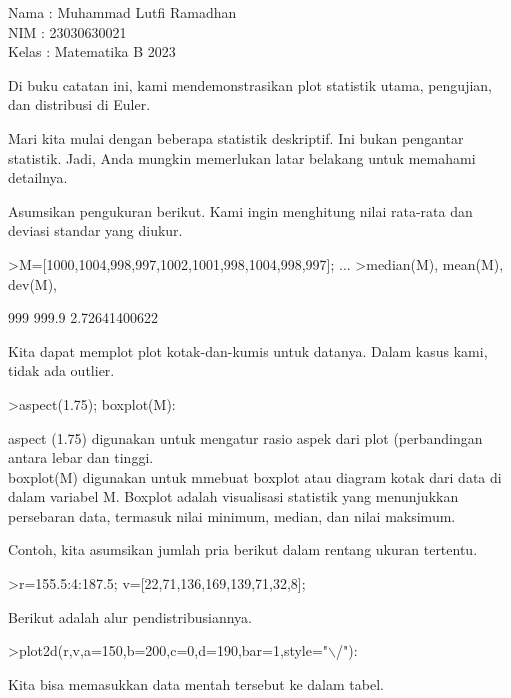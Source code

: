 \documentclass[a4paper,10pt]{article}
\begin{document}
\begin{eulernotebook}
\begin{eulercomment}
Nama : Muhammad Lutfi Ramadhan\\
NIM : 23030630021\\
Kelas : Matematika B 2023

\begin{eulercomment}
\begin{eulercomment}
Di buku catatan ini, kami mendemonstrasikan plot statistik utama,
pengujian, dan distribusi di Euler.

Mari kita mulai dengan beberapa statistik deskriptif. Ini bukan
pengantar statistik. Jadi, Anda mungkin memerlukan latar belakang
untuk memahami detailnya.

Asumsikan pengukuran berikut. Kami ingin menghitung nilai rata-rata
dan deviasi standar yang diukur.
\end{eulercomment}
\begin{eulerprompt}
>M=[1000,1004,998,997,1002,1001,998,1004,998,997]; ...
>median(M), mean(M), dev(M),
\end{eulerprompt}
\begin{euleroutput}
  999
  999.9
  2.72641400622
\end{euleroutput}
\begin{eulercomment}
Kita dapat memplot plot kotak-dan-kumis untuk datanya. Dalam kasus
kami, tidak ada outlier.
\end{eulercomment}
\begin{eulerprompt}
>aspect(1.75); boxplot(M):
\end{eulerprompt}
\begin{eulercomment}
aspect (1.75) digunakan untuk mengatur rasio aspek dari plot
(perbandingan antara lebar dan tinggi.\\
boxplot(M) digunakan untuk mmebuat boxplot atau diagram kotak dari
data di dalam variabel M. Boxplot adalah visualisasi statistik yang
menunjukkan persebaran data, termasuk nilai minimum, median, dan nilai
maksimum.

Contoh, kita asumsikan jumlah pria berikut dalam rentang ukuran
tertentu.
\end{eulercomment}
\begin{eulerprompt}
>r=155.5:4:187.5; v=[22,71,136,169,139,71,32,8];
\end{eulerprompt}
\begin{eulercomment}
Berikut adalah alur pendistribusiannya.
\end{eulercomment}
\begin{eulerprompt}
>plot2d(r,v,a=150,b=200,c=0,d=190,bar=1,style="\(\backslash\)/"):
\end{eulerprompt}
\begin{eulercomment}
Kita bisa memasukkan data mentah tersebut ke dalam tabel.


\end{eulercomment}
\end{eulercomment}
\end{eulercomment}
\end{eulernotebook}
\end{document}
